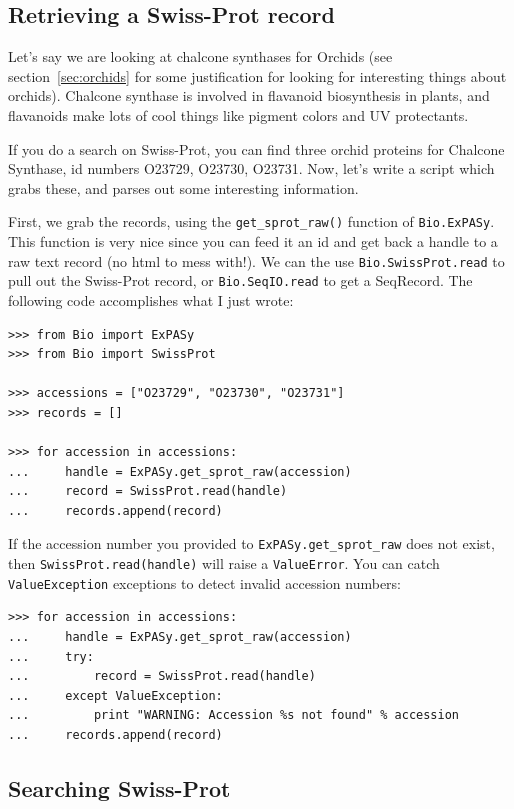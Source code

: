 \documentclass{report}
\begin{document}
\subsection{Retrieving a Swiss-Prot record}
\label{subsec:expasy_swissprot}

Let's say we are looking at chalcone synthases for Orchids (see section~\ref{sec:orchids} for some justification for looking for interesting things about orchids). Chalcone synthase is involved in flavanoid biosynthesis in plants, and flavanoids make lots of cool things like pigment colors and UV protectants. 

If you do a search on Swiss-Prot, you can find three orchid proteins for Chalcone Synthase, id numbers O23729, O23730, O23731. Now, let's write a script which grabs these, and parses out some interesting information.

First, we grab the records, using the \verb|get_sprot_raw()| function of \verb|Bio.ExPASy|. This function is very nice since you can feed it an id and get back a handle to a raw text record (no html to mess with!). We can the use \verb|Bio.SwissProt.read| to pull out the Swiss-Prot record, or \verb|Bio.SeqIO.read| to get a SeqRecord. The following code accomplishes what I just wrote:

\begin{verbatim}
>>> from Bio import ExPASy
>>> from Bio import SwissProt

>>> accessions = ["O23729", "O23730", "O23731"]
>>> records = []

>>> for accession in accessions:
...     handle = ExPASy.get_sprot_raw(accession)
...     record = SwissProt.read(handle)
...     records.append(record)
\end{verbatim}

If the accession number you provided to \verb|ExPASy.get_sprot_raw| does not exist, then \verb|SwissProt.read(handle)| will raise a \verb|ValueError|. You can catch \verb|ValueException| exceptions to detect invalid accession numbers:

\begin{verbatim}
>>> for accession in accessions:
...     handle = ExPASy.get_sprot_raw(accession)
...     try:
...         record = SwissProt.read(handle)
...     except ValueException:
...         print "WARNING: Accession %s not found" % accession
...     records.append(record)
\end{verbatim}

\subsection{Searching Swiss-Prot}
\end{document}
